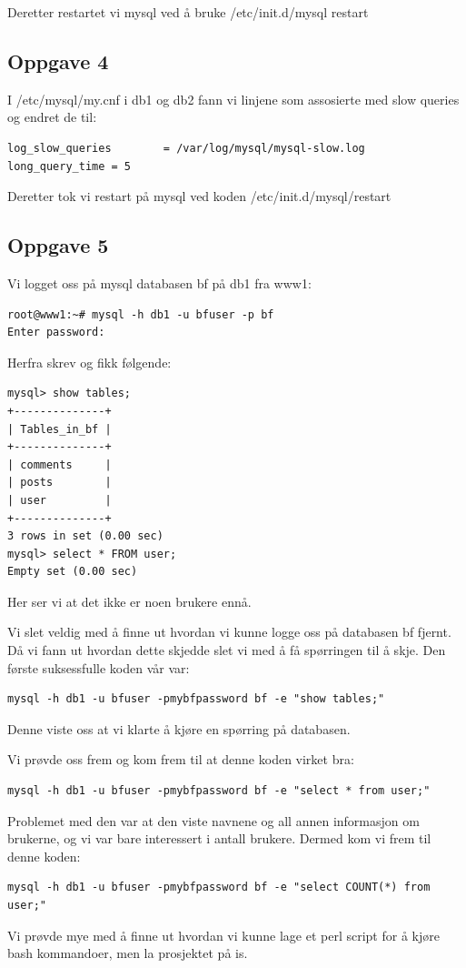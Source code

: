 \documentclass[a4paper, norsk, 12pt]{article}
\begin{document}
Deretter restartet vi mysql ved å bruke /etc/init.d/mysql restart
\subsection{Oppgave 4}
I /etc/mysql/my.cnf i db1 og db2 fann vi linjene som assosierte med slow queries og endret de til:
\begin{verbatim}
log_slow_queries        = /var/log/mysql/mysql-slow.log
long_query_time = 5
\end{verbatim}
Deretter tok vi restart på mysql ved koden /etc/init.d/mysql/restart
\subsection{Oppgave 5}
Vi logget oss på mysql databasen bf på db1 fra www1:
\begin{verbatim}
root@www1:~# mysql -h db1 -u bfuser -p bf
Enter password:
\end{verbatim}
Herfra skrev og fikk følgende:
\begin{verbatim}
mysql> show tables;
+--------------+
| Tables_in_bf |
+--------------+
| comments     |
| posts        |
| user         |
+--------------+
3 rows in set (0.00 sec)
mysql> select * FROM user;
Empty set (0.00 sec)
\end{verbatim}
Her ser vi at det ikke er noen brukere ennå.

Vi slet veldig med å finne ut hvordan vi kunne logge oss på databasen bf fjernt. Då vi fann ut hvordan dette skjedde slet vi med å få spørringen til å skje. Den første suksessfulle koden vår var: \hspace*{\fill} \\[-\dimexpr\baselineskip+\parskip\relax]
\begin{verbatim}
mysql -h db1 -u bfuser -pmybfpassword bf -e "show tables;"  
\end{verbatim}
Denne viste oss at vi klarte å kjøre en spørring på databasen.

Vi prøvde oss frem og kom frem til at denne koden virket bra:\hspace*{\fill} \\[-\dimexpr\baselineskip+\parskip\relax]
\begin{verbatim}
mysql -h db1 -u bfuser -pmybfpassword bf -e "select * from user;"
\end{verbatim}
Problemet med den var at den viste navnene og all annen informasjon om brukerne, og vi var bare interessert i antall brukere. Dermed kom vi frem til denne koden:\hspace*{\fill} \\[-\dimexpr\baselineskip+\parskip\relax]
\begin{verbatim}
mysql -h db1 -u bfuser -pmybfpassword bf -e "select COUNT(*) from user;"
\end{verbatim}
Vi prøvde mye med å finne ut hvordan vi kunne lage et perl script for å kjøre bash kommandoer, men la prosjektet på is.
\end{document}
